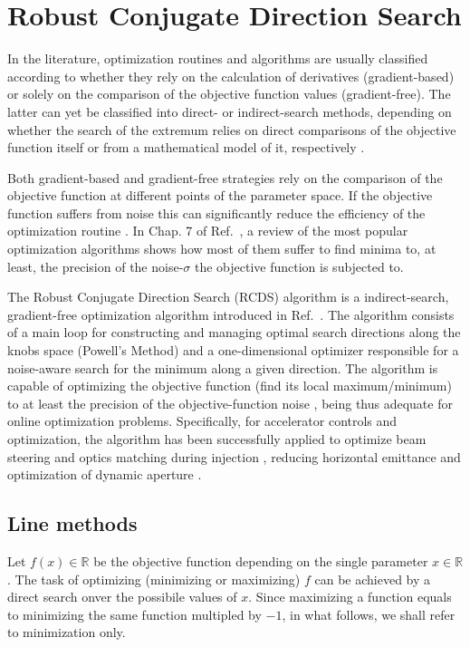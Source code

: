 \section{Robust Conjugate Direction Search}
In the literature, optimization routines and algorithms are usually classified according to whether they rely on the calculation of derivatives (gradient-based) or solely on the comparison of the objective function values (gradient-free). The latter can yet be classified into direct- or indirect-search methods, depending on whether the search of the extremum relies on direct comparisons of the objective function itself or from a mathematical model of it, respectively \cite{numerical_recipes}.

Both gradient-based and gradient-free strategies rely on the comparison of the objective function at different points of the parameter space. If the objective function suffers from noise this can significantly reduce the efficiency of the optimization routine \cite{numerical_recipes, huang2019beam}. In Chap. 7 of Ref.~\cite{huang2019beam}, a review of the most popular optimization algorithms shows how most of them suffer to find minima to, at least, the precision of the noise-$\sigma$ the objective function is subjected to.

The Robust Conjugate Direction Search (RCDS) algorithm is a indirect-search, gradient-free optimization algorithm introduced in Ref.~\cite{Huang:2013}. The algorithm consists of a main loop for constructing and managing optimal search directions along the knobs space (Powell's Method) and a one-dimensional optimizer responsible for a noise-aware search for the minimum along a given direction. The algorithm is capable of optimizing the objective function (find its local maximum/minimum) to at least the precision of the objective-function noise \cite{Huang:2013, huang2019beam}, being thus adequate for online optimization problems. Specifically, for accelerator controls and optimization, the algorithm has been successfully applied to optimize beam steering and optics matching during injection \cite{Huang:2013}, reducing horizontal emittance \cite{Huang:2013, Huang:2015}and optimization of dynamic aperture \cite{Huang:2013,Huang:2015,Liuzzo:IPAC2016-THPMR015,Olsson:IPAC2018-WEPAL047,yang:ipac2022-tupopt064}.
\subsection{Line methods}
Let $f(x)\in\mathbb{R}$ be the objective function depending on the single parameter $x\in\mathbb{R}$. The task of optimizing (minimizing or maximizing) $f$ can be achieved by a direct search onver the possibile values of $x$. Since maximizing a function equals to minimizing the same function multipled by $-1$, in what follows, we shall refer to minimization only.


